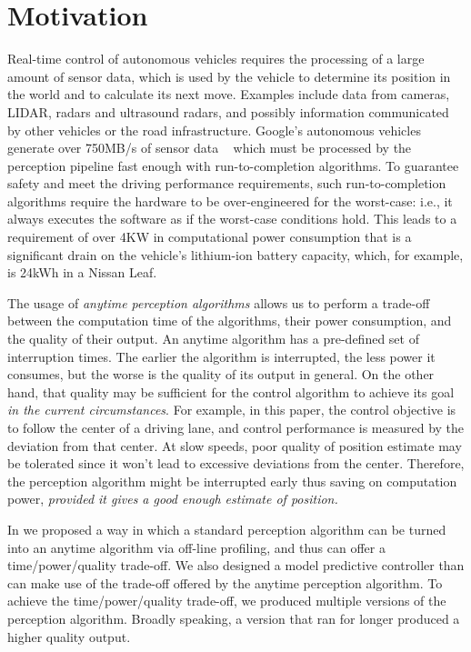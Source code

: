 \section{Motivation}
\label{sec:motivation}
Real-time control of autonomous vehicles requires the processing of a large amount of sensor data, which is used by the vehicle to determine its position in the world and to calculate its next move.
Examples include data from cameras, LIDAR, radars and ultrasound radars, and possibly information communicated by other vehicles or the road infrastructure.
Google's autonomous vehicles generate over 750MB/s of sensor data ~\cite{diamandis2015bold} which must be processed by the perception pipeline fast enough with run-to-completion algorithms. 
To guarantee safety and meet the driving performance requirements, such run-to-completion algorithms require the hardware to be over-engineered for the worst-case: i.e., it always executes the software as if the worst-case conditions hold.
This leads to a requirement of over 4KW in computational power consumption that is a significant drain on the vehicle's lithium-ion battery capacity, which, for example, is 24kWh in a Nissan Leaf.

The usage of \emph{anytime perception algorithms} allows us to perform a trade-off between the computation time of the algorithms, their power consumption, and the quality of their output.
An anytime algorithm has a pre-defined set of interruption times. 
The earlier the algorithm is interrupted, the less power it consumes, but the worse is the quality of its output in general. 
On the other hand, that quality may be sufficient for the control algorithm to achieve its goal \emph{in the current circumstances}.
For example, in this paper, the control objective is to follow the center of a driving lane, and control performance is measured by the deviation from that center.
At slow speeds, poor quality of position estimate may be tolerated since it won't lead to excessive deviations from the center.
Therefore, the perception algorithm might be interrupted early thus saving on computation power, \emph{provided it gives a good enough estimate of position. }

In \cite{RTSS15} we proposed a way in which a standard perception algorithm can be turned into an anytime algorithm via off-line profiling, and thus can offer a time/power/quality trade-off.
We also designed a model predictive controller than can make use of the trade-off offered by the anytime perception algorithm.
To achieve the time/power/quality trade-off, we produced multiple versions of the perception algorithm.
Broadly speaking, a version that ran for longer produced a higher quality output. 


